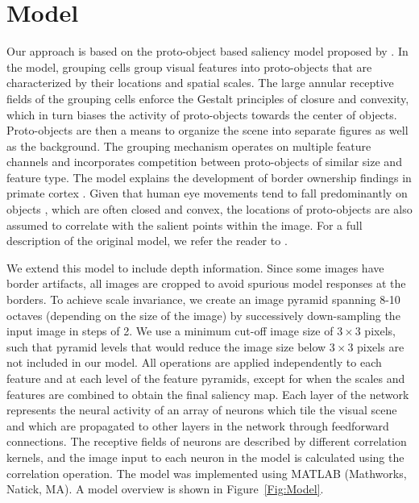 \documentclass[12pt]{article}
\begin{document}
\section{Model}
Our approach is based on the proto-object based saliency model proposed by \cite{Russell_etal14}.
In the model, grouping cells group visual features into proto-objects that are characterized by their locations and spatial scales. The large annular receptive fields of the grouping cells enforce the Gestalt principles of closure and convexity, which in turn biases the activity of proto-objects towards the center of objects. Proto-objects are then a means to organize the scene
into separate figures as well as the background.
The grouping mechanism
operates on multiple feature channels and incorporates competition
between proto-objects of similar size and feature type. The model
explains the development of border ownership findings in primate
cortex \citep{Craft_etal07,Zhou_etal00}.
Given that human eye movements tend to
fall predominantly on objects
\citep[][ but see \cite{Borji_etal13}
for a different view]{Einhauser_etal08a},
which are often closed and convex,
the locations of
proto-objects are also assumed to correlate with the salient points
within the image. For a full description of the original model, we
refer the reader to \cite{Russell_etal14}.

We extend this model to include depth information.
Since some images have border artifacts, all images are cropped to avoid
spurious model responses at the borders. To achieve scale invariance, we create an image pyramid spanning 8-10 octaves (depending on the size of the image) by successively down-sampling the input image in steps of 2. We use a minimum cut-off image size of $3\times 3$ pixels, such that pyramid levels that would reduce the image size below $3\times 3$  pixels are not included in our model. All operations are applied independently to each feature and at each level of the feature pyramids, except for when the scales and features are combined to obtain the final saliency map. Each layer of the network represents the neural activity of an array of neurons which tile the visual scene and  which are propagated to other layers in the network through feedforward connections. The receptive fields of neurons are described by different correlation kernels, and the image input to each neuron in the model is calculated using the correlation operation. The model was implemented using MATLAB (Mathworks, Natick, MA). A model overview is shown in Figure~\ref{Fig:Model}.
\end{document}
